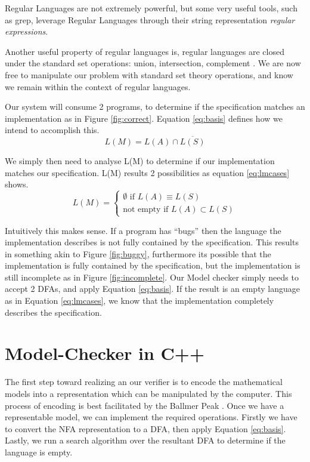 \documentclass[12pt,journal,compsoc]{IEEEtran}
\begin{document}
Regular Languages are not extremely powerful, but some very useful tools,
such as grep, leverage Regular Languages through their string representation
\emph{regular expressions}. 

Another useful property of regular
languages is, regular languages are closed under the standard set operations: union,
intersection, complement \cite[p.~45]{Sipser}.  We are now free to manipulate
our problem with standard set theory operations, and know we remain within the
context of regular languages.  

Our system will consume 2 programs, to determine if the
specification matches an implementation as in Figure \ref{fig:correct}.
Equation \ref{eq:basis} defines how we intend to accomplish this. 
\begin{equation}
L( M ) = L( A ) \cap \overline{L ( S ) } 
\label{eq:basis}
\end{equation}

We simply then need to analyse L(M) to determine if our implementation matches
our specification. L(M) results 2 possibilities as equation \ref{eq:lmcases}
shows.
\begin{equation}
    L(M) = 
    \begin{cases}
        \emptyset \text{ if } L(A) \equiv L(S)\\
        \text{not empty if } L(A) \subset L(S) 
    \end{cases}
    \label{eq:lmcases}
\end{equation}

Intuitively this makes sense.  If a program has ``bugs'' then the language the
implementation describes is not fully contained by the specification.  This results
in something akin to Figure \ref{fig:buggy}, furthermore its possible that the
implementation is fully contained by the specification, but the implementation
is still incomplete as in Figure \ref{fig:incomplete}.  Our Model checker simply
needs to accept 2 DFAs, and apply Equation \ref{eq:basis}.  If the result is an
empty language as in Equation \ref{eq:lmcases}, we know that the implementation
completely describes the specification.

\section{Model-Checker in C++}
The first step toward realizing an our verifier is to encode the mathematical
models into a representation which can be manipulated by the computer. This
process of encoding is best facilitated by the Ballmer Peak \cite{ballmer-peak}. 
Once we have a representable model, we can implement the required operations.
Firstly we have to convert the NFA representation to a DFA, then apply Equation
\ref{eq:basis}. Lastly, we run a search algorithm over the resultant DFA to
determine if the language is empty.
\end{document}
